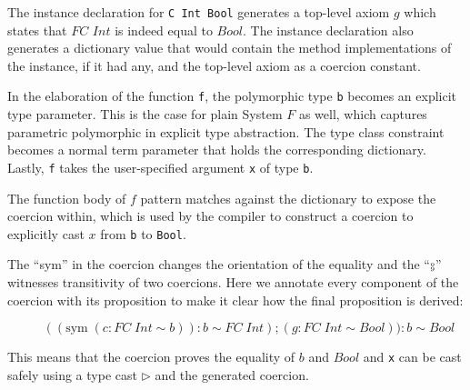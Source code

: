 The instance declaration for \texttt{C Int Bool} generates a top-level axiom
$g$ which states that $FC$ $Int$ is indeed equal to $Bool$. The instance
declaration also generates a dictionary value that would contain the method
implementations of the instance, if it had any, and the top-level axiom as a
coercion constant.

In the elaboration of the function \texttt{f}, the polymorphic type \texttt{b}
becomes an explicit type parameter. This is the case for plain System $F$ as well,
which captures parametric polymorphic in explicit type abstraction.
The type class constraint becomes a
normal term parameter that holds the corresponding dictionary. Lastly,
\texttt{f} takes the user-specified argument \texttt{x} of type \texttt{b}.

The function body of $f$ pattern matches against the dictionary to expose the
coercion within, which is used by the compiler to construct a coercion to
explicitly cast $x$ from \texttt{b} to \texttt{Bool}.

The ``sym'' in the coercion changes the orientation of the equality and the
``$\fctrans$'' witnesses transitivity of two coercions. Here we annotate every
component of the coercion with its proposition to make it clear how the
final proposition is derived:

\[
\quad\quad((\text{sym} \; (c : FC \; Int \sim b)) : b \sim FC \; Int) ; (g : FC
\; Int \sim Bool) ) : b \sim Bool
\]

This means that the coercion proves the equality of $b$ and $Bool$ and
\texttt{x} can be cast safely using a type cast $\triangleright$ and the
generated coercion.

